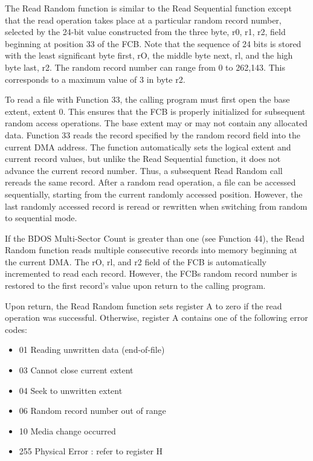 The Read Random function is similar to the Read Sequential function
except that the read operation takes place at a particular random
record number, selected by the 24-bit value constructed from the three
byte, r0, r1, r2, field beginning at position 33 of the FCB. Note that
the sequence of 24 bits is stored with the least significant byte
first, rO, the middle byte next, rl, and the high byte last, r2. The
random record number can range from 0 to 262,143. This corresponds to
a maximum value of 3 in byte r2.

To read a file with Function 33, the calling program must first open
the base extent, extent 0. This ensures that the FCB is properly
initialized for subsequent random access operations. The base extent
may or may not contain any allocated data. Function 33 reads the
record specified by the random record field into the current DMA
address. The function automatically sets the logical extent and
current record values, but unlike the Read Sequential function, it
does not advance the current record number. Thus, a subsequent Read
Random call rereads the same record. After a random read operation, a
file can be accessed sequentially, starting from the current randomly
accessed position. However, the last randomly accessed record is
reread or rewritten when switching from random to sequential mode.

If the BDOS Multi-Sector Count is greater than one (see Function 44),
the Read Random function reads multiple consecutive records into
memory beginning at the current DMA. The rO, rl, and r2 field of the
FCB is automatically incremented to read each record. However, the
FCBs random record number is restored to the first record's value upon
return to the calling program.

Upon return, the Read Random function sets register A to zero if the
read operation was successful. Otherwise, register A contains one of
the following error codes:

\begin{itemize}
\item 01 Reading unwritten data (end-of-file)
\item 03 Cannot close current extent
\item 04 Seek to unwritten extent
\item 06 Random record number out of range
\item 10 Media change occurred
\item 255 Physical Error : refer to register H
\end{itemize}


